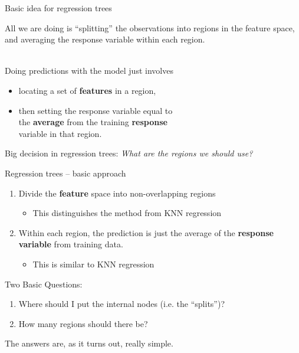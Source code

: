 \documentclass[mathserif, aspectratio=169]{beamer}
\begin{document}
\begin{frame}{Basic idea for regression trees}

\begin{center}
All we are doing is ``splitting'' the observations into regions in the feature space, and averaging the response variable within each region.\\~\\
\pause
\end{center}

Doing predictions with the model just involves 
\begin{itemize}
\item locating a set of \textbf{features} in a region, 
\item then setting the response variable equal to\\ the \textbf{average} from the training \textbf{response}\\ variable in that region.  
\end{itemize}
\pause

\vspace{5mm}

Big decision in regression trees: \textit{What are the regions we should use?}
\end{frame}


\begin{frame}{Regression trees -- basic approach}

\begin{enumerate}
\item Divide the \textbf{feature} space into non-overlapping regions
\begin{itemize}
\item This distinguishes the method from KNN regression
\end{itemize}
\item Within each region, the prediction is just the average of the \textbf{response variable} from training data.
\begin{itemize}
\item This is similar to KNN regression
\end{itemize}
\end{enumerate}

\pause

Two Basic Questions:

\begin{enumerate}
\item Where should I put the internal nodes (i.e. the ``splits'')?
\item How many regions should there be?
\end{enumerate}

The answers are, as it turns out, really simple.  

\end{frame}
\end{document}
